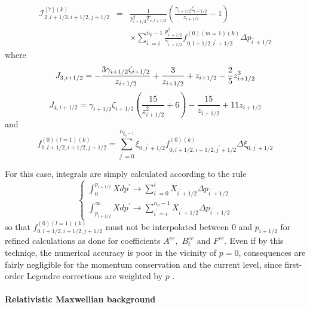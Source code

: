 \begin{eqnarray}
\mathcal{I}_{2,l+1/2,i+1/2,j+1/2}^{\left[ 7\right] \left( k\right) } &=&%
\frac{1}{p_{i+1/2}^{2}\overline{T}_{e,l+1/2}}\left( \frac{\gamma
_{i+1/2}\zeta _{i+1/2}}{z_{i+1/2}}-1\right)  \nonumber \\
&&\times \sum_{i^{\prime }=i}^{n_{p}-1}\frac{p_{i^{\prime }+1/2}^{2}}{\gamma
_{i^{\prime }+1/2}}f_{0,l+1/2,i^{\prime }+1/2}^{\left( 0\right) \left(
m=1\right) \left( k\right) }\Delta p_{i^{\prime }+1/2}
\end{eqnarray}
where
\begin{equation}
J_{3,i+1/2}=-\frac{3\gamma _{i+1/2}\zeta _{i+1/2}}{z_{i+1/2}}+\frac{3}{%
z_{i+1/2}}+z_{i+1/2}-\frac{2}{5}z_{i+1/2}^{3}
\end{equation}
\begin{equation}
J_{4,i+1/2}=\gamma _{i+1/2}\zeta _{i+1/2}\left( \frac{15}{z_{i+1/2}^{2}}
+6\right) -\frac{15}{z_{i+1/2}}+11z_{i+1/2}
\end{equation}
and
\begin{equation}
f_{0,l+1/2,i+1/2,j+1/2}^{\left( 0\right) \left( l=1\right) \left( k\right)
}=\sum_{j^{\prime }=0}^{n_{\xi _{0}-1}}\xi _{0,j^{\prime
}+1/2}f_{0,l+1/2,i+1/2,j^{\prime }+1/2}^{\left( 0\right) \left( k\right)
}\Delta \xi _{0,j^{\prime }+1/2}
\end{equation}

For this case, integrals are simply calculated according to the rule
\begin{equation}
\left\{
\begin{array}{l}
\int_{0}^{p_{i+1/2}}Xdp^{\prime }\rightarrow \sum_{i^{\prime
}=0}^{i}X_{i^{\prime }+1/2}\Delta p_{i^{\prime }+1/2} \\
\int_{p_{i+1/2}}^{\infty }Xdp^{\prime }\rightarrow \sum_{i^{\prime
}=i}^{n_{p}-1}X_{i^{\prime }+1/2}\Delta p_{i^{\prime }+1/2}
\end{array}
\right.
\end{equation}
so that $f_{0,l+1/2,i+1/2,j+1/2}^{\left( 0\right) \left( l=1\right) \left(
k\right) }$ must not be interpolated between $0$ and $p_{i+1/2}$ for refined
calculations as done for coefficients $A^{ee},$ $B_{t}^{ee}$ and $F^{ee}.$
Even if by this techniqe, the numerical accuracy is poor in the vicinity of $%
p=0$, consequences are fairly negligible for the momentum conservation and
the current level, since first-order Legendre corrections are weighted by $p$%
.

\paragraph{Relativistic Maxwellian background}

